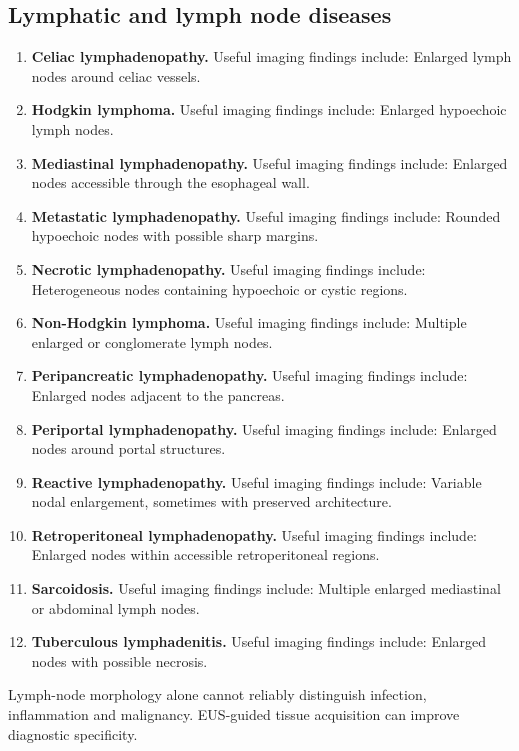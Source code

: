 \subsection{Lymphatic and lymph node diseases}
\begin{enumerate}[leftmargin=*,itemsep=0.45em,topsep=0.4em]
\item \textbf{Celiac lymphadenopathy.} Useful imaging findings include: Enlarged lymph nodes around celiac vessels.
\item \textbf{Hodgkin lymphoma.} Useful imaging findings include: Enlarged hypoechoic lymph nodes.
\item \textbf{Mediastinal lymphadenopathy.} Useful imaging findings include: Enlarged nodes accessible through the esophageal wall.
\item \textbf{Metastatic lymphadenopathy.} Useful imaging findings include: Rounded hypoechoic nodes with possible sharp margins.
\item \textbf{Necrotic lymphadenopathy.} Useful imaging findings include: Heterogeneous nodes containing hypoechoic or cystic regions.
\item \textbf{Non-Hodgkin lymphoma.} Useful imaging findings include: Multiple enlarged or conglomerate lymph nodes.
\item \textbf{Peripancreatic lymphadenopathy.} Useful imaging findings include: Enlarged nodes adjacent to the pancreas.
\item \textbf{Periportal lymphadenopathy.} Useful imaging findings include: Enlarged nodes around portal structures.
\item \textbf{Reactive lymphadenopathy.} Useful imaging findings include: Variable nodal enlargement, sometimes with preserved architecture.
\item \textbf{Retroperitoneal lymphadenopathy.} Useful imaging findings include: Enlarged nodes within accessible retroperitoneal regions.
\item \textbf{Sarcoidosis.} Useful imaging findings include: Multiple enlarged mediastinal or abdominal lymph nodes.
\item \textbf{Tuberculous lymphadenitis.} Useful imaging findings include: Enlarged nodes with possible necrosis.
\end{enumerate}
Lymph-node morphology alone cannot reliably distinguish infection, inflammation and malignancy. EUS-guided tissue acquisition can improve diagnostic specificity.

